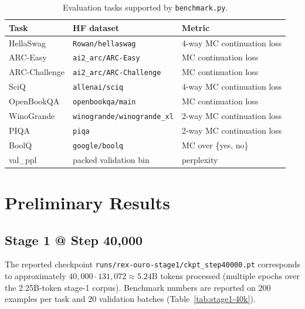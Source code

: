 \documentclass[11pt,a4paper]{article}
\begin{document}
\begin{table}[h]
  \centering
  \caption{Evaluation tasks supported by \texttt{benchmark.py}.}
  \label{tab:tasks}
  \footnotesize
  \begin{tabular}{lll}
    \toprule
    Task & HF dataset & Metric \\
    \midrule
    HellaSwag & \texttt{Rowan/hellaswag} & 4-way MC continuation loss \\
    ARC-Easy & \texttt{ai2\_arc/ARC-Easy} & MC continuation loss \\
    ARC-Challenge & \texttt{ai2\_arc/ARC-Challenge} & MC continuation loss \\
    SciQ & \texttt{allenai/sciq} & 4-way MC continuation loss \\
    OpenBookQA & \texttt{openbookqa/main} & MC continuation loss \\
    WinoGrande & \texttt{winogrande/winogrande\_xl} & 2-way MC continuation loss \\
    PIQA & \texttt{piqa} & 2-way MC continuation loss \\
    BoolQ & \texttt{google/boolq} & MC over \{yes, no\} \\
    val\_ppl & packed validation bin & perplexity \\
    \bottomrule
  \end{tabular}
\end{table}

\section{Preliminary Results}

\subsection{Stage 1 @ Step 40{,}000}

The reported checkpoint \texttt{runs/rex-ouro-stage1/ckpt\_step40000.pt}
corresponds to approximately $40{,}000 \cdot 131{,}072 \approx 5.24\mathrm{B}$
tokens processed (multiple epochs over the 2.25B-token stage-1 corpus).
Benchmark numbers are reported on 200 examples per task and 20 validation
batches (Table~\ref{tab:stage1-40k}).
\end{document}
